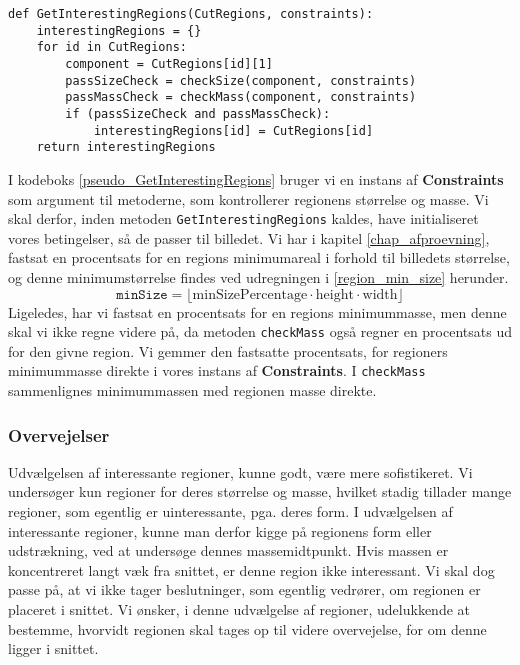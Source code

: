 {\begin{lstlisting}[caption={Metode som returnerer kun de insteressante
    regioner, givet en instans af $\angles{CutRegions}$}, captionpos=b,
    label={pseudo_GetInterestingRegions}, frame=tb, breaklines=false,
    float=t]
def GetInterestingRegions(CutRegions, constraints):
    interestingRegions = {}
    for id in CutRegions:
        component = CutRegions[id][1]
        passSizeCheck = checkSize(component, constraints)
        passMassCheck = checkMass(component, constraints)
        if (passSizeCheck and passMassCheck):
            interestingRegions[id] = CutRegions[id]
    return interestingRegions
\end{lstlisting}

I kodeboks \ref{pseudo_GetInterestingRegions} bruger vi en instans af
\textbf{Constraints} som argument til metoderne, som kontrollerer
regionens størrelse og masse. Vi skal derfor, inden metoden
\texttt{GetInterestingRegions} kaldes, have initialiseret vores
betingelser, så de passer til billedet. Vi har i kapitel
\ref{chap_afproevning}, fastsat en procentsats for en regions
minimumareal i forhold til billedets størrelse, og denne
minimumstørrelse findes ved udregningen i \eqref{region_min_size}
herunder.
\begin{equation}
    \mathtt{minSize} =
    \lfloor
    \mathrm{minSizePercentage}\cdot\mathrm{height}\cdot\mathrm{width}
    \rfloor
    \label{region_min_size}
\end{equation}
Ligeledes, har vi fastsat en procentsats for en regions minimummasse, men denne
skal vi ikke regne videre på, da metoden \texttt{checkMass} også regner
en procentsats ud for den givne region. Vi gemmer den fastsatte
procentsats, for regioners minimummasse direkte i vores instans af
\textbf{Constraints}. I \texttt{checkMass} sammenlignes minimummassen
med regionen masse direkte.

\subsubsection{Overvejelser}
Udvælgelsen af interessante regioner, kunne godt, være mere
sofistikeret.  Vi undersøger kun regioner for deres størrelse og masse,
hvilket stadig tillader mange regioner, som egentlig er uinteressante,
pga. deres form.  I udvælgelsen af interessante regioner, kunne man
derfor kigge på regionens form eller udstrækning, ved at undersøge
dennes massemidtpunkt.  Hvis massen er koncentreret langt væk fra
snittet, er denne region ikke interessant. Vi skal dog passe på, at vi
ikke tager beslutninger, som egentlig vedrører, om regionen er placeret
i snittet. Vi ønsker, i denne udvælgelse af regioner, udelukkende at
bestemme, hvorvidt regionen skal tages op til videre overvejelse, for om
denne ligger i snittet.

}
